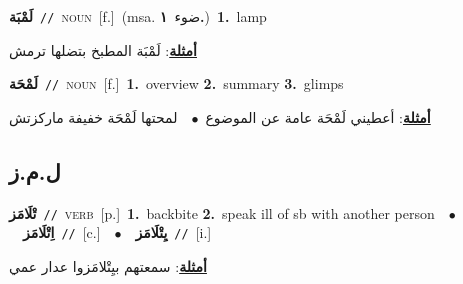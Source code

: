 \documentclass[10pt,a4paper,twoside]{article} %
\begin{document}
\begin{multicols}{2}
{\setlength\topsep{0pt}\textbf{\foreignlanguage{arabic}{لَمْبَة}}\ {\color{gray}\texttt{//}\color{black}}\ \textsc{noun}\ [f.]\ \color{gray}(msa. \foreignlanguage{arabic}{ضوء}~\foreignlanguage{arabic}{\textbf{١.}})\color{black}\ \textbf{1.}~lamp\  \begin{flushright}\color{gray}\foreignlanguage{arabic}{\textbf{\underline{\foreignlanguage{arabic}{أمثلة}}}: لَمْبَة المطبخ بتضلها ترمش}\end{flushright}\color{black}} \vspace{2mm}

{\setlength\topsep{0pt}\textbf{\foreignlanguage{arabic}{لَمْحَة}}\ {\color{gray}\texttt{//}\color{black}}\ \textsc{noun}\ [f.]\ \textbf{1.}~overview  \textbf{2.}~summary  \textbf{3.}~glimps\  \begin{flushright}\color{gray}\foreignlanguage{arabic}{\textbf{\underline{\foreignlanguage{arabic}{أمثلة}}}: أعطيني لَمْحَة عامة عن الموضوع\ $\bullet$\ \  لمحتها لَمْحَة خفيفة ماركزتش}\end{flushright}\color{black}} \vspace{2mm}

\vspace{-3mm}
\subsection*{\color{blue}\foreignlanguage{arabic}{ل.م.ز}\color{blue}{}} 

{\setlength\topsep{0pt}\textbf{\foreignlanguage{arabic}{تْلَامَز}}\ {\color{gray}\texttt{//}\color{black}}\ \textsc{verb}\ [p.]\ \textbf{1.}~backbite  \textbf{2.}~speak ill of sb with another person\ \ $\bullet$\ \ \setlength\topsep{0pt}\textbf{\foreignlanguage{arabic}{اِتْلَامَز}}\ {\color{gray}\texttt{//}\color{black}}\ [c.]\ \ $\bullet$\ \ \setlength\topsep{0pt}\textbf{\foreignlanguage{arabic}{يِتْلَامَز}}\ {\color{gray}\texttt{//}\color{black}}\ [i.]\  \begin{flushright}\color{gray}\foreignlanguage{arabic}{\textbf{\underline{\foreignlanguage{arabic}{أمثلة}}}: سمعتهم بيِتْلامَزوا عدار عمي}\end{flushright}\color{black}} \vspace{2mm}


\end{multicols}
\end{document}
